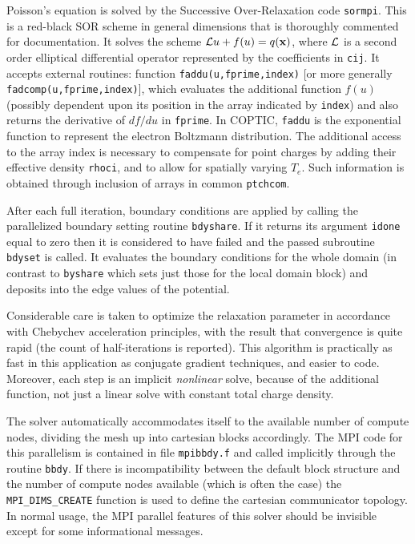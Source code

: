 \documentclass[12pt]{article}
\begin{document}
Poisson's equation is solved by the Successive Over-Relaxation code
\verb!sormpi!. This is a red-black SOR scheme in general dimensions
that is thoroughly commented for documentation. It solves the scheme
${\cal L}u+f(u) = q({\bf x})$, where ${\cal L}$ is a second order
elliptical differential operator represented by the coefficients in
\verb!cij!. It accepts external routines: function
\verb!faddu(u,fprime,index)! [or more generally
\verb!fadcomp(u,fprime,index)!], which evaluates the additional
function $f(u)$ (possibly dependent upon its position in the array
indicated by \verb!index!) and also returns the derivative of $df/du$
in \verb!fprime!. In COPTIC, \verb!faddu! is the exponential function
to represent the electron Boltzmann distribution. The additional
access to the array index is necessary to compensate for point charges
by adding their effective density \verb!rhoci!, and to allow for
spatially varying $T_e$. Such information is obtained through
inclusion of arrays in common \verb!ptchcom!.

After each full iteration, boundary conditions are applied by calling
the parallelized boundary setting routine \verb!bdyshare!. If it
returns its argument \verb!idone!  equal to zero then it is
considered to have failed and the passed subroutine \verb!bdyset! is
called. It evaluates the boundary conditions for the whole domain (in
contrast to \verb!byshare! which sets just those for the local domain
block) and deposits into the edge values of the potential.

Considerable care is taken to optimize the relaxation parameter in
accordance with Chebychev acceleration principles, with the result
that convergence is quite rapid (the count of half-iterations is
reported). This algorithm is practically as fast in this application as
conjugate gradient techniques, and easier to code. Moreover, each step is an
implicit \emph{nonlinear} solve, because of the additional function,
not just a linear solve with constant total charge density.

The solver automatically accommodates itself to the available number
of compute nodes, dividing the mesh up into cartesian blocks
accordingly.  The MPI code for this parallelism is contained in file
\verb!mpibbdy.f! and called implicitly through the routine
\verb!bbdy!. If there is incompatibility between the default block
structure and the number of compute nodes available (which is often
the case) the \verb!MPI_DIMS_CREATE! function is used to define the
cartesian communicator topology. In normal usage, the MPI parallel
features of this solver should be invisible except for some
informational messages.  
\end{document}
